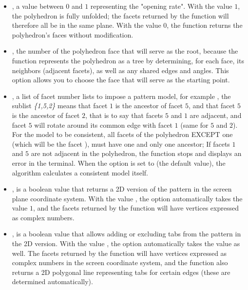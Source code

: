 \begin{itemize}
    \item {}, a value between $0$ and $1$ representing the "opening rate". With the value $1$, the polyhedron is fully unfolded; the facets returned by the function will therefore all be in the same plane. With the value $0$, the function returns the polyhedron's faces without modification.

    \item {}, the number of the polyhedron face that will serve as the root, because the function represents the polyhedron as a tree by determining, for each face, its neighbors (adjacent facets), as well as any shared edges and angles. This option allows you to choose the face that will serve as the starting point.

    \item {}, a list of facet number lists to impose a pattern model, for example , the sublist \emph{\{1,5,2\}} means that facet $1$ is the ancestor of facet $5$, and that facet $5$ is the ancestor of facet $2$, that is to say that facets $5$ and $1$ are adjacent, and facet $5$ will rotate around its common edge with facet $1$ (same for $5$ and $2$). For the model to be consistent, all facets of the polyhedron EXCEPT one (which will be the facet ), must have one and only one ancestor; If facets $1$ and $5$ are not adjacent in the polyhedron, the function stops and displays an error in the terminal. When the  option is set to \nil (the default value), the algorithm calculates a consistent model itself.

    \item {}, is a boolean value that returns a 2D version of the pattern in the screen plane coordinate system. With the value \true, the  option automatically takes the value $1$, and the facets returned by the function will have vertices expressed as complex numbers.

    \item {}, is a boolean value that allows adding or excluding tabs from the pattern in the 2D version. With the value \true, the  option automatically takes the value \true as well. The facets returned by the function will have vertices expressed as complex numbers in the screen coordinate system, and the function also returns a 2D polygonal line representing tabs for certain edges (these are determined automatically).


\end{itemize}
